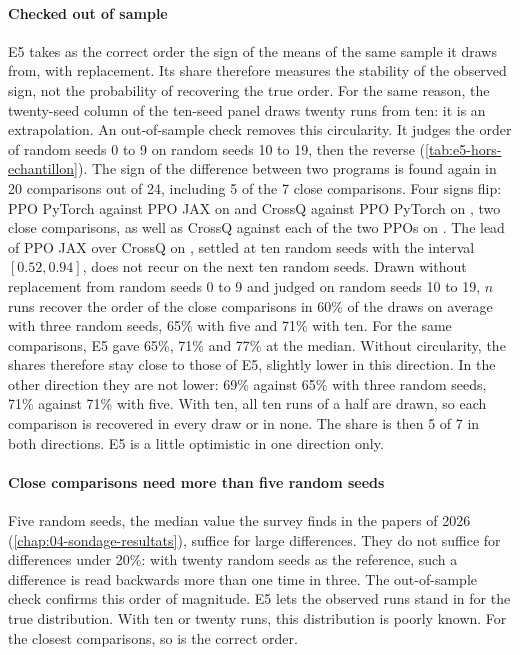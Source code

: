 \paragraph{Checked out of sample}
E5 takes as the correct order the sign of the means of the same sample it draws from, with replacement. Its
share therefore measures the stability of the observed sign, not the probability of recovering the true
order. For the same reason, the twenty-seed column of the ten-seed panel draws twenty runs from ten: it is an
extrapolation. An out-of-sample check removes this circularity. It judges the order
of random seeds 0 to 9 on random seeds 10 to 19, then the reverse (\cref{tab:e5-hors-echantillon}). The sign
of the difference between two programs is found again in 20 comparisons out of 24, including 5 of the 7 close
comparisons. Four signs flip: PPO PyTorch against PPO JAX on  and CrossQ against PPO PyTorch
on , two close comparisons, as well as CrossQ against each of the two PPOs on . The lead
of PPO JAX over CrossQ on , settled at ten random seeds with the interval $[0.52, 0.94]$, does not
recur on the next ten random seeds. Drawn without replacement from random seeds 0 to 9
and judged on random seeds 10 to 19, $n$ runs recover the order of the close comparisons in 60\% of the draws
on average with three random seeds, 65\% with five and 71\% with ten. For the same comparisons, E5 gave 65\%,
71\% and 77\% at the median. Without circularity, the shares therefore stay close to those of E5, slightly
lower in this direction. In the other direction they are not lower: 69\% against 65\% with three random
seeds, 71\% against 71\% with five. With ten, all ten runs of a half are drawn, so each comparison is
recovered in every draw or in none. The share is then 5 of 7 in both directions. E5 is a little optimistic in
one direction only.


\paragraph{Close comparisons need more than five random seeds}
Five random seeds, the median value the survey finds in the papers of 2026 (\cref{chap:04-sondage-resultats}),
suffice for large differences. They do not suffice for differences under 20\%: with twenty random seeds as the
reference, such a difference is read backwards more than one time in three. The out-of-sample check confirms this order of
magnitude. E5 lets the observed runs stand in for the true distribution. With ten or twenty runs, this
distribution is poorly known. For the closest comparisons, so is the correct order.

